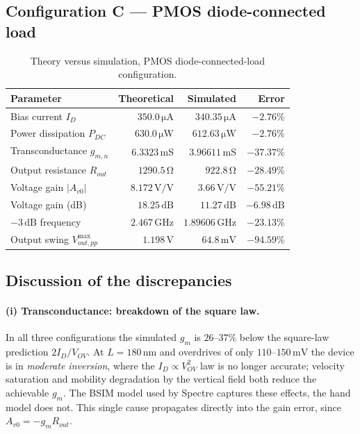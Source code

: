 \documentclass[12pt,a4paper]{article}
\newcommand{\U}[1]{\,\mathrm{#1}}
\begin{document}
\subsection{Configuration C --- PMOS diode-connected load}
\begin{table}[H]
\centering
\caption{Theory versus simulation, PMOS diode-connected-load configuration.}
\label{tab:tvsC}
\begin{tabular}{lrrr}
\toprule
\textbf{Parameter} & \textbf{Theoretical} & \textbf{Simulated} & \textbf{Error} \\
\midrule
Bias current $I_D$            & $350.0\U{\mu A}$   & $340.35\U{\mu A}$  & $-2.76\%$ \\
Power dissipation $P_{DC}$    & $630.0\U{\mu W}$   & $612.63\U{\mu W}$  & $-2.76\%$ \\
Transconductance $g_{m,n}$    & $6.3323\U{mS}$     & $3.96611\U{mS}$    & $-37.37\%$ \\
Output resistance $R_{out}$   & $1290.5\U{\Omega}$ & $922.8\U{\Omega}$  & $-28.49\%$ \\
Voltage gain $|A_{v0}|$       & $8.172\U{V/V}$     & $3.66\U{V/V}$      & $-55.21\%$ \\
Voltage gain (dB)             & $18.25\U{dB}$      & $11.27\U{dB}$      & $-6.98\U{dB}$ \\
$-3\U{dB}$ frequency          & $2.467\U{GHz}$     & $1.89606\U{GHz}$   & $-23.13\%$ \\
Output swing $V_{out,pp}^{\max}$ & $1.198\U{V}$    & $64.8\U{mV}$       & $-94.59\%$ \\
\bottomrule
\end{tabular}
\end{table}

\subsection{Discussion of the discrepancies}

\paragraph{(i) Transconductance: breakdown of the square law.}
In all three configurations the simulated $g_m$ is $26$--$37\%$ below the
square-law prediction $2I_D/V_{OV}$. At $L=180\U{nm}$ and overdrives of only
$110$--$150\U{mV}$ the device is in \emph{moderate inversion}, where the
$I_D \propto V_{OV}^2$ law is no longer accurate; velocity saturation and
mobility degradation by the vertical field both reduce the achievable $g_m$.
The BSIM model used by Spectre captures these effects, the hand model does not.
This single cause propagates directly into the gain error, since
$A_{v0}=-g_m R_{out}$.
\end{document}
